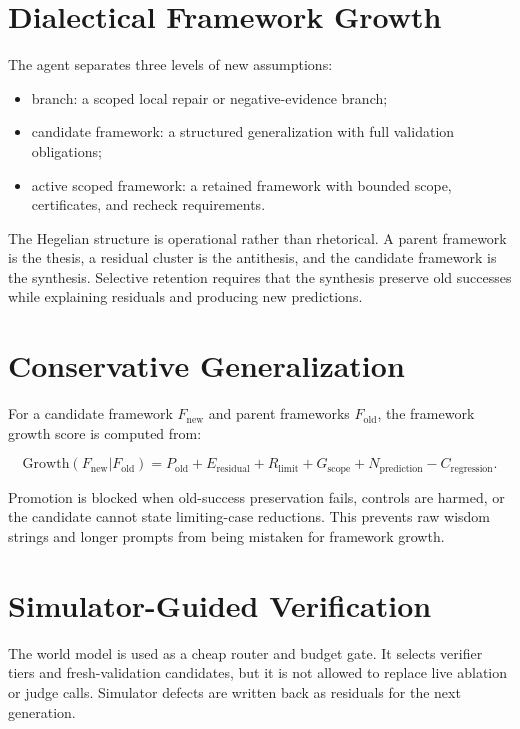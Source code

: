 \documentclass[11pt]{article}
\begin{document}
\section{Dialectical Framework Growth}

The agent separates three levels of new assumptions:

\begin{itemize}
  \item branch: a scoped local repair or negative-evidence branch;
  \item candidate framework: a structured generalization with full validation obligations;
  \item active scoped framework: a retained framework with bounded scope, certificates, and recheck requirements.
\end{itemize}

The Hegelian structure is operational rather than rhetorical.  A parent
framework is the thesis, a residual cluster is the antithesis, and the candidate
framework is the synthesis.  Selective retention requires that the synthesis
preserve old successes while explaining residuals and producing new predictions.

\section{Conservative Generalization}

For a candidate framework \(F_{\mathrm{new}}\) and parent frameworks
\(F_{\mathrm{old}}\), the framework growth score is computed from:

\[
\mathrm{Growth}(F_{\mathrm{new}} | F_{\mathrm{old}}) =
P_{\mathrm{old}} + E_{\mathrm{residual}} + R_{\mathrm{limit}} +
G_{\mathrm{scope}} + N_{\mathrm{prediction}} - C_{\mathrm{regression}}.
\]

Promotion is blocked when old-success preservation fails, controls are harmed,
or the candidate cannot state limiting-case reductions.  This prevents raw
wisdom strings and longer prompts from being mistaken for framework growth.

\section{Simulator-Guided Verification}

The world model is used as a cheap router and budget gate.  It selects verifier
tiers and fresh-validation candidates, but it is not allowed to replace live
ablation or judge calls.  Simulator defects are written back as residuals for the
next generation.
\end{document}
